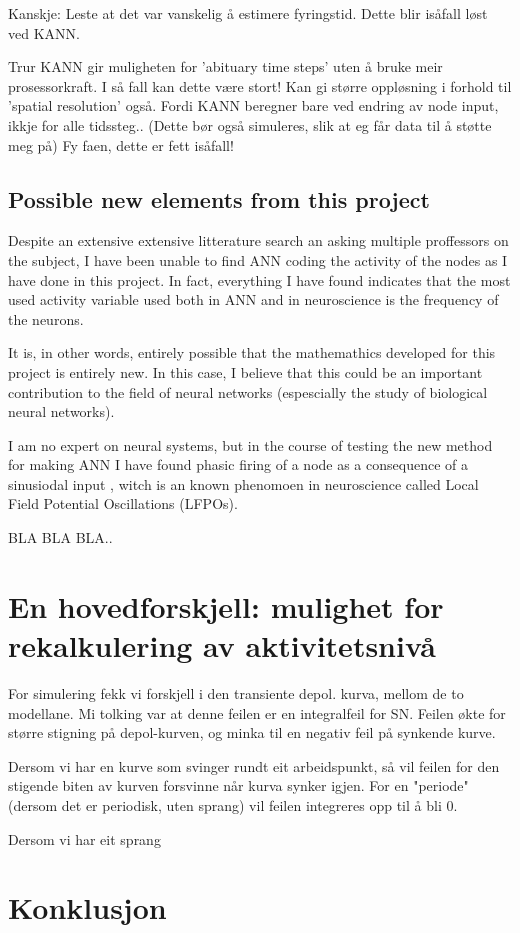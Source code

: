 	Kanskje: Leste at det var vanskelig å estimere fyringstid. Dette blir isåfall løst ved KANN.

	Trur KANN gir muligheten for 'abituary time steps' uten å bruke meir prosessorkraft. I så fall kan dette være stort! Kan gi større oppløsning i forhold til 'spatial resolution' også.
	Fordi KANN beregner bare ved endring av node input, ikkje for alle tidssteg..
	(Dette bør også simuleres, slik at eg får data til å støtte meg på)  	Fy faen, dette er fett isåfall!


	\subsection{Possible new elements from this project}
	Despite an extensive extensive litterature search an asking multiple proffessors on the subject, I have been unable to find ANN coding the activity of the nodes as I have done in this project.
	In fact, everything I have found indicates that the most used activity variable used both in ANN and in neuroscience is the frequency of the neurons.
	
	It is, in other words, entirely possible that the mathemathics developed for this project is entirely new. 
	In 	this case, I believe that this could be an important contribution to the field of neural networks (espescially the study of biological neural networks).

	I am no expert on neural systems, but in the course of testing the new method for making ANN I have found phasic firing of a node as a consequence of a sinusiodal input %
	, witch is an known phenomoen in neuroscience called Local Field Potential Oscillations (LFPOs).
	
	BLA BLA BLA..

\section{En hovedforskjell: mulighet for rekalkulering av aktivitetsnivå}
	For simulering fekk vi forskjell i den transiente depol. kurva, mellom de to modellane.
	Mi tolking var at denne feilen er en integralfeil for SN. Feilen økte for større stigning på depol-kurven, og minka til en negativ feil på synkende kurve.
	
	Dersom vi har en kurve som svinger rundt eit arbeidspunkt, så vil feilen for den stigende biten av kurven forsvinne når kurva synker igjen. For en "periode" (dersom det er periodisk, uten sprang) vil feilen integreres opp til å bli 0.

	Dersom vi har eit sprang 


	\section{ Konklusjon }


